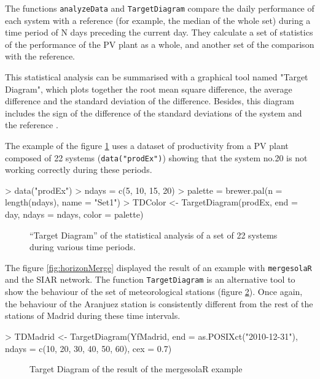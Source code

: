 \documentclass[a4paper]{article}
\renewenvironment{Schunk}{\vspace{\topsep}}{\vspace{\topsep}}
\newcommand{\code}[1]{{\texttt{#1}}}
\begin{document}
The functions \code{analyzeData} and \code{TargetDiagram} compare the
daily performance of each system with a reference (for example, the
median of the whole set) during a time period of N days preceding the
current day. They calculate a set of statistics of the performance of
the PV plant as a whole, and another set of the comparison with the
reference. 

This statistical analysis can be summarised with a graphical tool
named "Target Diagram", which plots together the root mean square
difference, the average difference and the standard deviation of the
difference. Besides, this diagram includes the sign of the difference
of the standard deviations of the system and the reference
\cite{Jolliff.Kindle.ea2009,Taylor2000}.

The example of the figure \ref{fig:TargetDiagram} uses a dataset of
productivity from a PV plant composed of 22 systems
(\code{data("prodEx")}) showing that the system no.20 is not
working correctly during these periods.

\begin{Schunk}
\begin{Sinput}
> data("prodEx")
> ndays = c(5, 10, 15, 20)
> palette = brewer.pal(n = length(ndays), name = "Set1")
> TDColor <- TargetDiagram(prodEx, end = day, 
      ndays = ndays, 
      color = palette)
\end{Sinput}
\end{Schunk}

\begin{figure}
  \centering
  \caption{``Target Diagram'' of the statistical analysis of a set of 22 systems during various time periods.}
  \label{fig:TargetDiagram}
\end{figure}

The figure \ref{fig:horizonMerge} displayed the result of an example
with \code{mergesolaR} and the SIAR network. The function
\code{TargetDiagram} is an alternative tool to show the behaviour of
the set of meteorological stations (figure
\ref{fig:TargetMerge}). Once again, the behaviour of the Aranjuez
station is consistently different from the rest of the stations of Madrid during
these time intervals.

\begin{Schunk}
\begin{Sinput}
> TDMadrid <- TargetDiagram(YfMadrid, 
     end = as.POSIXct("2010-12-31"), 
     ndays = c(10, 20, 30, 40, 50, 60), 
     cex = 0.7)
\end{Sinput}
\end{Schunk}

\begin{figure}
  \centering
  \caption{Target Diagram of the result of the mergesolaR example}
  \label{fig:TargetMerge}
\end{figure}



\end{document}
